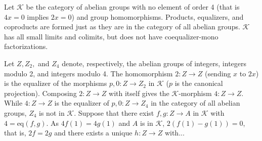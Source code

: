 Let $\mathcal{K}$ be the category of abelian groups with no element of order 4 (that is $4x = 0$ implies $2x = 0$) and group homomorphisms. Products, equalizers, and coproducts are formed just as they are in the category of all abelian groups. $\mathcal{K}$ has all small limits and colimits, but does not have coequalizer-mono factorizations.

Let $Z, Z_2,$ and $Z_4$ denote, respectively, the abelian groups of integers, integers modulo 2, and integers modulo 4. The homomorphism $2:Z \longrightarrow Z$ (sending $x$ to $2x$) is the equalizer of the morphisms $p, 0:Z \longrightarrow Z_2$ in $\mathcal{K}$ ($p$ is the canonical projection). Composing $2:Z \longrightarrow Z$ with itself gives the $\mathcal{K}$-morphism $4:Z \longrightarrow Z$. While $4:Z \longrightarrow Z$ is the equalizer of $p, 0:Z \longrightarrow Z_4$ in the category of all abelian groups, $Z_4$ is not in $\mathcal{K}$. Suppose that there exist $f, g:Z \longrightarrow A$ in $\mathcal{K}$ with $4 = \text{eq}(f, g)$. As $4f(1) = 4g(1)$ and $A$ is in $\mathcal{K}$, $2(f(1) - g(1)) = 0$, that is, $2f = 2g$ and there exists a unique $h:Z \longrightarrow Z$ with...
